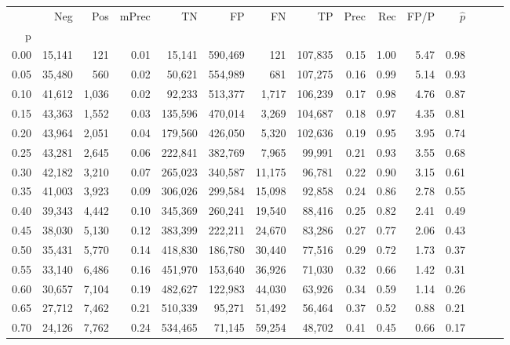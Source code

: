 \begin{tabular}{rrrrrrrrrrrrrrr}
\toprule
{} &     Neg &    Pos & mPrec &       TN &       FP &       FN &       TP &  Prec &   Rec &  FP/P & $\hat{p}$ \\
p    &         &        &       &          &          &          &          &       &       &       &           \\
\midrule
0.00 &  15,141 &    121 &  0.01 &   15,141 &  590,469 &      121 &  107,835 &  0.15 &  1.00 &  5.47 &      0.98 \\
0.05 &  35,480 &    560 &  0.02 &   50,621 &  554,989 &      681 &  107,275 &  0.16 &  0.99 &  5.14 &      0.93 \\
0.10 &  41,612 &  1,036 &  0.02 &   92,233 &  513,377 &    1,717 &  106,239 &  0.17 &  0.98 &  4.76 &      0.87 \\
0.15 &  43,363 &  1,552 &  0.03 &  135,596 &  470,014 &    3,269 &  104,687 &  0.18 &  0.97 &  4.35 &      0.81 \\
0.20 &  43,964 &  2,051 &  0.04 &  179,560 &  426,050 &    5,320 &  102,636 &  0.19 &  0.95 &  3.95 &      0.74 \\
0.25 &  43,281 &  2,645 &  0.06 &  222,841 &  382,769 &    7,965 &   99,991 &  0.21 &  0.93 &  3.55 &      0.68 \\
0.30 &  42,182 &  3,210 &  0.07 &  265,023 &  340,587 &   11,175 &   96,781 &  0.22 &  0.90 &  3.15 &      0.61 \\
0.35 &  41,003 &  3,923 &  0.09 &  306,026 &  299,584 &   15,098 &   92,858 &  0.24 &  0.86 &  2.78 &      0.55 \\
0.40 &  39,343 &  4,442 &  0.10 &  345,369 &  260,241 &   19,540 &   88,416 &  0.25 &  0.82 &  2.41 &      0.49 \\
0.45 &  38,030 &  5,130 &  0.12 &  383,399 &  222,211 &   24,670 &   83,286 &  0.27 &  0.77 &  2.06 &      0.43 \\
0.50 &  35,431 &  5,770 &  0.14 &  418,830 &  186,780 &   30,440 &   77,516 &  0.29 &  0.72 &  1.73 &      0.37 \\
0.55 &  33,140 &  6,486 &  0.16 &  451,970 &  153,640 &   36,926 &   71,030 &  0.32 &  0.66 &  1.42 &      0.31 \\
0.60 &  30,657 &  7,104 &  0.19 &  482,627 &  122,983 &   44,030 &   63,926 &  0.34 &  0.59 &  1.14 &      0.26 \\
0.65 &  27,712 &  7,462 &  0.21 &  510,339 &   95,271 &   51,492 &   56,464 &  0.37 &  0.52 &  0.88 &      0.21 \\
0.70 &  24,126 &  7,762 &  0.24 &  534,465 &   71,145 &   59,254 &   48,702 &  0.41 &  0.45 &  0.66 &      0.17 \\

\end{tabular}
